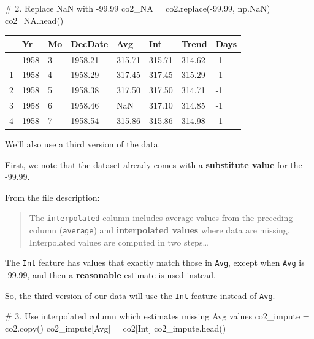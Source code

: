 \documentclass[
  letterpaper,
  DIV=11,
  numbers=noendperiod]{scrreprt}
\newenvironment{Shaded}{\begin{snugshade}}{\end{snugshade}}
\newcommand{\CommentTok}[1]{\textcolor[rgb]{0.37,0.37,0.37}{#1}}
\newcommand{\FloatTok}[1]{\textcolor[rgb]{0.68,0.00,0.00}{#1}}
\newcommand{\NormalTok}[1]{\textcolor[rgb]{0.00,0.23,0.31}{#1}}
\newcommand{\OperatorTok}[1]{\textcolor[rgb]{0.37,0.37,0.37}{#1}}
\newcommand{\StringTok}[1]{\textcolor[rgb]{0.13,0.47,0.30}{#1}}
\begin{document}
\begin{Shaded}
\begin{Highlighting}[]
\CommentTok{\# 2. Replace NaN with {-}99.99}
\NormalTok{co2\_NA }\OperatorTok{=}\NormalTok{ co2.replace(}\OperatorTok{{-}}\FloatTok{99.99}\NormalTok{, np.NaN)}
\NormalTok{co2\_NA.head()}
\end{Highlighting}
\end{Shaded}

\begin{longtable}[]{@{}llllllll@{}}
\toprule\noalign{}
& Yr & Mo & DecDate & Avg & Int & Trend & Days \\
\midrule\noalign{}
\endhead
\bottomrule\noalign{}
\endlastfoot
0 & 1958 & 3 & 1958.21 & 315.71 & 315.71 & 314.62 & -1 \\
1 & 1958 & 4 & 1958.29 & 317.45 & 317.45 & 315.29 & -1 \\
2 & 1958 & 5 & 1958.38 & 317.50 & 317.50 & 314.71 & -1 \\
3 & 1958 & 6 & 1958.46 & NaN & 317.10 & 314.85 & -1 \\
4 & 1958 & 7 & 1958.54 & 315.86 & 315.86 & 314.98 & -1 \\
\end{longtable}

We'll also use a third version of the data.

First, we note that the dataset already comes with a \textbf{substitute
value} for the -99.99.

From the file description:

\begin{quote}
The \texttt{interpolated} column includes average values from the
preceding column (\texttt{average}) and \textbf{interpolated values}
where data are missing. Interpolated values are computed in two
steps\ldots{}
\end{quote}

The \texttt{Int} feature has values that exactly match those in
\texttt{Avg}, except when \texttt{Avg} is -99.99, and then a
\textbf{reasonable} estimate is used instead.

So, the third version of our data will use the \texttt{Int} feature
instead of \texttt{Avg}.

\begin{Shaded}
\begin{Highlighting}[]
\CommentTok{\# 3. Use interpolated column which estimates missing Avg values}
\NormalTok{co2\_impute }\OperatorTok{=}\NormalTok{ co2.copy()}
\NormalTok{co2\_impute[}\StringTok{\textquotesingle{}Avg\textquotesingle{}}\NormalTok{] }\OperatorTok{=}\NormalTok{ co2[}\StringTok{\textquotesingle{}Int\textquotesingle{}}\NormalTok{]}
\NormalTok{co2\_impute.head()}
\end{Highlighting}
\end{Shaded}
\end{document}
